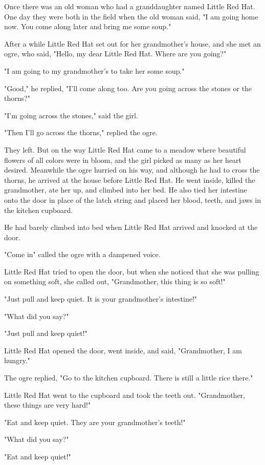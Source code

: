 Once there was an old woman who had a granddaughter named Little Red Hat. One day they were both in the field when the old woman said, "I am going home now. You come along later and bring me some soup."

After a while Little Red Hat set out for her grandmother's house, and she met an ogre, who said, "Hello, my dear Little Red Hat. Where are you going?"

"I am going to my grandmother's to take her some soup."

"Good," he replied, "I'll come along too. Are you going across the stones or the thorns?"

"I'm going across the stones," said the girl.

"Then I'll go across the thorns," replied the ogre.

They left. But on the way Little Red Hat came to a meadow where beautiful flowers of all colors were in bloom, and the girl picked as many as her heart desired. Meanwhile the ogre hurried on his way, and although he had to cross the thorns, he arrived at the house before Little Red Hat. He went inside, killed the grandmother, ate her up, and climbed into her bed. He also tied her intestine onto the door in place of the latch string and placed her blood, teeth, and jaws in the kitchen cupboard.

He had barely climbed into bed when Little Red Hat arrived and knocked at the door.

"Come in" called the ogre with a dampened voice.

Little Red Hat tried to open the door, but when she noticed that she was pulling on something soft, she called out, "Grandmother, this thing is so soft!"

"Just pull and keep quiet. It is your grandmother's intestine!"

"What did you say?"

"Just pull and keep quiet!"

Little Red Hat opened the door, went inside, and said, "Grandmother, I am hungry."

The ogre replied, "Go to the kitchen cupboard. There is still a little rice there."

Little Red Hat went to the cupboard and took the teeth out. "Grandmother, these things are very hard!"

"Eat and keep quiet. They are your grandmother's teeth!"

"What did you say?"

"Eat and keep quiet!"

